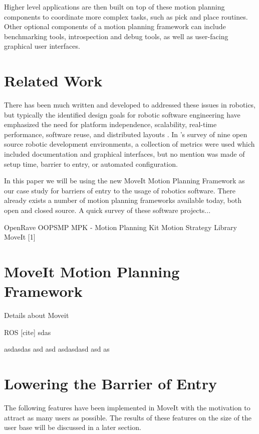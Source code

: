 \documentclass[10pt,journal,compsoc]{joser1}
\begin{document}
{Higher level applications are then built on top of these motion planning components to coordinate more complex tasks, such as pick and place routines. Other optional components of a motion planning framework can include benchmarking tools, introspection and debug tools, as well as user-facing graphical user interfaces. 


\section{Related Work}

There has been much written and developed to addressed these issues in robotics, but typically the identified design goals for robotic software engineering have emphasized the need for platform independence, scalability, real-time performance, software reuse, and distributed layouts \cite{realtime_framework, collett2005player, kramer2007development}. In \cite{kramer2007development}'s survey of nine open source robotic development environments, a collection of metrics were used which included documentation and graphical interfaces, but no mention was made of setup time, barrier to entry, or automated configuration. 

In this paper we will be using the new MoveIt Motion Planning Framework as our case study for barriers of entry to the usage of robotics software. There already exists a number of motion planning frameworks available today, both open and closed source. A quick survey of these software projects...

OpenRave
OOPSMP
MPK - Motion Planning Kit
Motion Strategy Library
MoveIt [1]

\section{MoveIt Motion Planning Framework}

Details about Moveit

ROS [cite] sdas

asdasdas asd asd asdasdasd asd as

\section{Lowering the Barrier of Entry}

The following features have been implemented in MoveIt with the motivation to attract as many users as possible. The results of these features on the size of the user base will be discussed in a later section.

}
\end{document}
